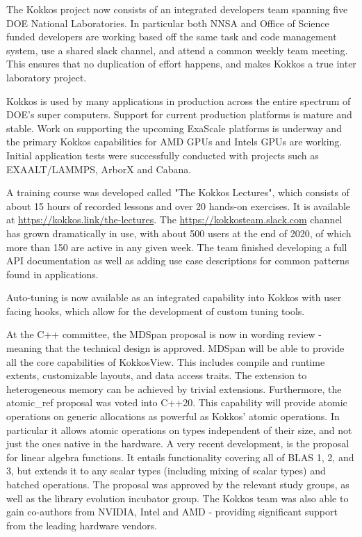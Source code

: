 The Kokkos project now consists of an integrated developers team spanning five DOE National Laboratories.
In particular both NNSA and Office of Science funded developers are working based off the same task and code management system, use a shared slack channel, and attend a common weekly team meeting.
This ensures that no duplication of effort happens, and makes Kokkos a true inter laboratory project.

Kokkos is used by many applications in production across the entire spectrum of DOE's super computers.
Support for current production platforms is mature and stable.
Work on supporting the upcoming ExaScale platforms is underway and the primary Kokkos capabilities for AMD GPUs and Intels GPUs are working. 
Initial application tests were successfully conducted with projects such as EXAALT/LAMMPS, ArborX and Cabana.

A training course was developed called "The Kokkos Lectures", which consists of about 15 hours of recorded lessons and over 20 hands-on exercises.
It is available at \url{https://kokkos.link/the-lectures}.
The \url{https://kokkosteam.slack.com} channel has grown dramatically in use, with about 500 users at the end of 2020, of which more than 150 are active in any given week.
The team finished developing a full API documentation as well as adding use case descriptions for common patterns found in applications.

Auto-tuning is now available as an integrated capability into Kokkos with user facing hooks, which allow for the development of custom tuning tools.

At the C++ committee, the MDSpan proposal is now in wording review - meaning that the technical design is approved. 
MDSpan will be able to provide all the core capabilities of Kokkos\:\:View.
This includes compile and runtime extents, customizable layouts, and data access traits.
The extension to heterogeneous memory can be achieved by trivial extensions. 
Furthermore, the atomic\_ref proposal was voted into C++20.
This capability will provide atomic operations on generic allocations as powerful as Kokkos' atomic operations.
In particular it allows atomic operations on types independent of their size, and not just the ones native in the hardware.
A very recent development, is the proposal for linear algebra functions.
It entails functionality covering all of BLAS 1, 2, and 3, but extends it to any scalar types (including mixing of scalar types) and batched operations.
The proposal was approved by the relevant study groups, as well as the library evolution incubator group.
The Kokkos team was also able to gain co-authors from NVIDIA, Intel and AMD - providing significant support from the leading hardware vendors.

